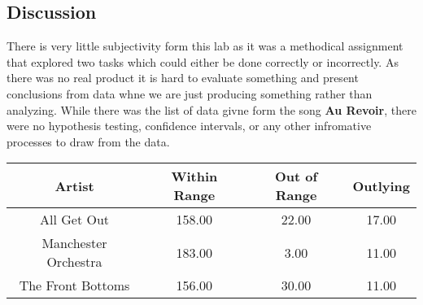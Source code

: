 \documentclass{article}\usepackage[]{graphicx}\usepackage[]{xcolor}
\begin{document}
\begin{multicols}{2}
\section{Discussion}

There is very little subjectivity form this lab as it was a methodical assignment that explored two tasks which could either be done correctly or incorrectly. As there was no real product it is hard to evaluate something and present conclusions from data whne we are just producing something rather than analyzing. While there was the list of data givne form the song \textbf{Au Revoir}, there were no hypothesis testing, confidence intervals, or any other infromative processes to draw from the data. 

\vspace{2em}


\begin{tiny}

\end{tiny}
\end{multicols}

\newpage
\onecolumn
\begin{table}[ht]
\centering
\begin{tabular}{|c|ccc|}
\hline
Artist & Within Range & Out of Range & Outlying \\ 
\hline
All Get Out & 158.00 & 22.00 & 17.00 \\ 
Manchester Orchestra & 183.00 & 3.00 & 11.00 \\ 
The Front Bottoms & 156.00 & 30.00 & 11.00 \\ 
\hline
\end{tabular}
\end{table}
\end{document}
